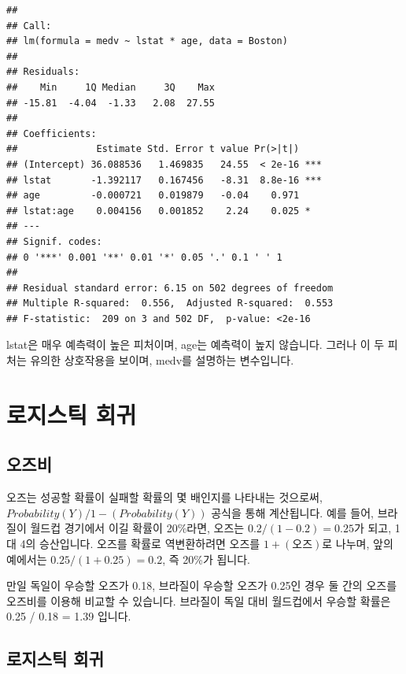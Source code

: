 \documentclass[12pt,]{book}
\begin{document}
\begin{verbatim}
## 
## Call:
## lm(formula = medv ~ lstat * age, data = Boston)
## 
## Residuals:
##    Min     1Q Median     3Q    Max 
## -15.81  -4.04  -1.33   2.08  27.55 
## 
## Coefficients:
##              Estimate Std. Error t value Pr(>|t|)    
## (Intercept) 36.088536   1.469835   24.55  < 2e-16 ***
## lstat       -1.392117   0.167456   -8.31  8.8e-16 ***
## age         -0.000721   0.019879   -0.04    0.971    
## lstat:age    0.004156   0.001852    2.24    0.025 *  
## ---
## Signif. codes:  
## 0 '***' 0.001 '**' 0.01 '*' 0.05 '.' 0.1 ' ' 1
## 
## Residual standard error: 6.15 on 502 degrees of freedom
## Multiple R-squared:  0.556,  Adjusted R-squared:  0.553 
## F-statistic:  209 on 3 and 502 DF,  p-value: <2e-16
\end{verbatim}

lstat은 매우 예측력이 높은 피처이며, age는 예측력이 높지 않습니다. 그러나 이 두 피처는 유의한 상호작용을 보이며, medv를 설명하는 변수입니다.

\hypertarget{uxb85cuxc9c0uxc2a4uxd2f1-uxd68cuxadc0}{%
\chapter{로지스틱 회귀}\label{uxb85cuxc9c0uxc2a4uxd2f1-uxd68cuxadc0}}

\hypertarget{uxc624uxc988uxbe44}{%
\section{오즈비}\label{uxc624uxc988uxbe44}}

오즈는 성공할 확률이 실패할 확률의 몇 배인지를 나타내는 것으로써, \(Probability(Y) / 1 - (Probability(Y))\) 공식을 통해 계산됩니다. 예를 들어, 브라질이 월드컵 경기에서 이길 확률이 20\%라면, 오즈는 \(0.2 / (1-0.2) = 0.25\)가 되고, 1대 4의 승산입니다. 오즈를 확률로 역변환하려면 오즈를 \(1 + (오즈)\)로 나누며, 앞의 예에서는 \(0.25 / (1+0.25) = 0.2\), 즉 20\%가 됩니다.

만일 독일이 우승할 오즈가 0.18, 브라질이 우승할 오즈가 0.25인 경우 둘 간의 오즈를 오즈비를 이용해 비교할 수 있습니다. 브라질이 독일 대비 월드컵에서 우승할 확률은 0.25 / 0.18 = 1.39 입니다.

\hypertarget{uxb85cuxc9c0uxc2a4uxd2f1-uxd68cuxadc0-1}{%
\section{로지스틱 회귀}\label{uxb85cuxc9c0uxc2a4uxd2f1-uxd68cuxadc0-1}}
\end{document}
